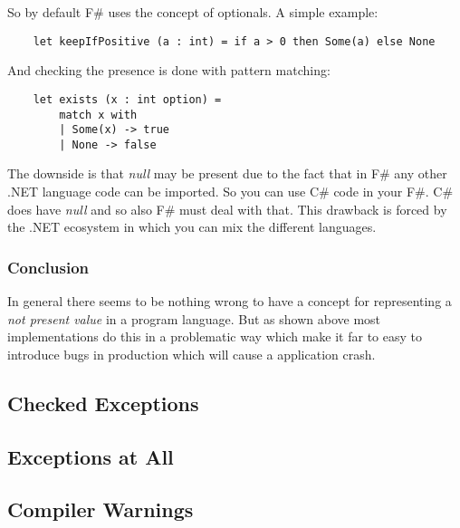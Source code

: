 \documentclass[12pt,a4paper]{report}
\begin{document}
\noindent
So by default F\# uses the concept of optionals\cite{optional-in-fsharp}. A simple example:

\begin{verbatim}
    let keepIfPositive (a : int) = if a > 0 then Some(a) else None
\end{verbatim}

And checking the presence is done with pattern matching:

\begin{verbatim}
    let exists (x : int option) =
        match x with
        | Some(x) -> true
        | None -> false
\end{verbatim}

The downside is that \textit{null} may be present due to the fact that in F\# any other .NET language code can be imported. So you can use C\# code in your F\#. C\# does have \textit{null} and so also F\# must deal with that. This drawback is forced by the .NET ecosystem in which you can mix the different languages.

\subsubsection{Conclusion}

In general there seems to be nothing wrong to have a concept for representing a \textit{not present value} in a program language. But as shown above most implementations do this in a problematic way which make it far to easy to introduce bugs in production which will cause a application crash.


\subsection{Checked Exceptions}


\subsection{Exceptions at All}


\subsection{Compiler Warnings}

\end{document}
